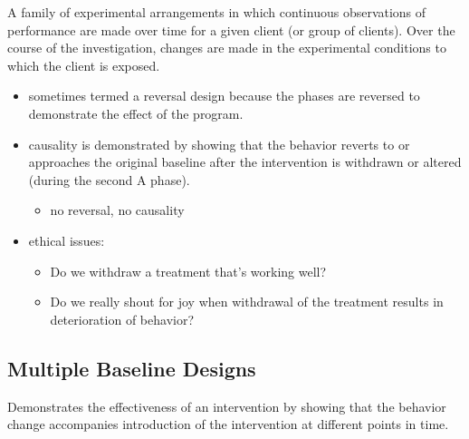 \documentclass[
  english,
]{book}
\providecommand{\tightlist}{%
  \setlength{\itemsep}{0pt}\setlength{\parskip}{0pt}}
\begin{document}
A family of experimental arrangements in which continuous observations of performance are made over time for a given client (or group of clients). Over the course of the investigation, changes are made in the experimental conditions to which the client is exposed.

\begin{itemize}
\tightlist
\item
  sometimes termed a reversal design because the phases are reversed to demonstrate the effect of the program.
\item
  causality is demonstrated by showing that the behavior reverts to or approaches the original baseline after the intervention is withdrawn or altered (during the second A phase).

  \begin{itemize}
  \tightlist
  \item
    no reversal, no causality
  \end{itemize}
\item
  ethical issues:

  \begin{itemize}
  \tightlist
  \item
    Do we withdraw a treatment that's working well?
  \item
    Do we really shout for joy when withdrawal of the treatment results in deterioration of behavior?
  \end{itemize}
\end{itemize}

\hypertarget{multiple-baseline-designs}{%
\subsection{Multiple Baseline Designs}\label{multiple-baseline-designs}}

Demonstrates the effectiveness of an intervention by showing that the behavior change accompanies introduction of the intervention at different points in time.
\end{document}
